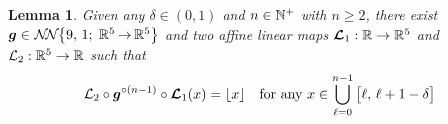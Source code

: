 \documentclass[nohyperref]{article}
\theoremstyle{plain}
\newtheorem{lemma}[theorem]{Lemma}
\theoremstyle{definition}
\theoremstyle{remark}
\begin{document}
\begin{lemma}
	\label{lem:floor:approx}
	Given any $\delta\in (0,1)$ and $n\in \N^+$ with $n\ge 2$,
	there exist $\bmg \in
	\nn[\big]{9}{1}{5}{5}$
	and two affine linear maps $\bmcalL_1:\R\to\R^5$ and $\calL_2:\R^5\to \R$ such that
	\begin{equation*}%
		\calL_2\circ\bmg^{\circ (n-1)}\circ \bmcalL_1(x)=\lfloor x\rfloor \quad \tn{for any $x\in \bigcup_{\ell=0}^{n-1}\big[\ell,\,\ell+1-\delta\big]$}
	\end{equation*}
\end{lemma}
	
	
	
\end{document}

